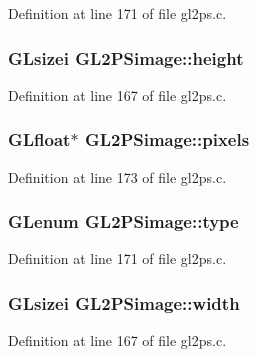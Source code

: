 Definition at line 171 of file gl2ps.\+c.

\hypertarget{struct_g_l2_p_simage_affb112b35e5551913e96eaf65a683ded}{}
\subsubsection[{height}]{\setlength{\rightskip}{0pt plus 5cm}G\+Lsizei G\+L2\+P\+Simage\+::height}\label{struct_g_l2_p_simage_affb112b35e5551913e96eaf65a683ded}


Definition at line 167 of file gl2ps.\+c.

\hypertarget{struct_g_l2_p_simage_a01dab5410ae39f9457752b979f0a6029}{}
\subsubsection[{pixels}]{\setlength{\rightskip}{0pt plus 5cm}G\+Lfloat$\ast$ G\+L2\+P\+Simage\+::pixels}\label{struct_g_l2_p_simage_a01dab5410ae39f9457752b979f0a6029}


Definition at line 173 of file gl2ps.\+c.

\hypertarget{struct_g_l2_p_simage_a3fc70a07fd043f7d0134f32b2894114f}{}
\subsubsection[{type}]{\setlength{\rightskip}{0pt plus 5cm}G\+Lenum G\+L2\+P\+Simage\+::type}\label{struct_g_l2_p_simage_a3fc70a07fd043f7d0134f32b2894114f}


Definition at line 171 of file gl2ps.\+c.

\hypertarget{struct_g_l2_p_simage_a770a027fc0f42680dc62d56b38fb1d99}{}
\subsubsection[{width}]{\setlength{\rightskip}{0pt plus 5cm}G\+Lsizei G\+L2\+P\+Simage\+::width}\label{struct_g_l2_p_simage_a770a027fc0f42680dc62d56b38fb1d99}


Definition at line 167 of file gl2ps.\+c.


